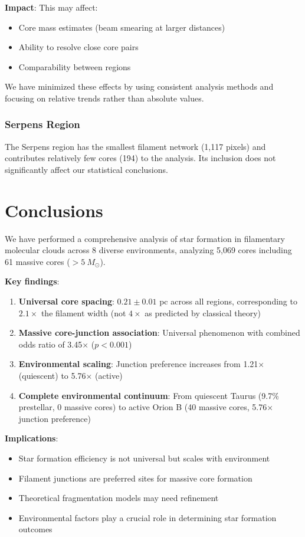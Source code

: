 \documentclass[11pt,a4paper]{article}
\begin{document}
\textbf{Impact}: This may affect:
\begin{itemize}
    \item Core mass estimates (beam smearing at larger distances)
    \item Ability to resolve close core pairs
    \item Comparability between regions
\end{itemize}

We have minimized these effects by using consistent analysis methods and focusing on relative trends rather than absolute values.

\subsubsection{Serpens Region}

The Serpens region has the smallest filament network (1,117 pixels) and contributes relatively few cores (194) to the analysis. Its inclusion does not significantly affect our statistical conclusions.

\section{Conclusions}

We have performed a comprehensive analysis of star formation in filamentary molecular clouds across 8 diverse environments, analyzing 5,069 cores including 61 massive cores ($>5~M_\odot$).

\textbf{Key findings}:
\begin{enumerate}
    \item \textbf{Universal core spacing}: $0.21 \pm 0.01$ pc across all regions, corresponding to $2.1\times$ the filament width (not $4\times$ as predicted by classical theory)
    \item \textbf{Massive core-junction association}: Universal phenomenon with combined odds ratio of 3.45$\times$ ($p < 0.001$)
    \item \textbf{Environmental scaling}: Junction preference increases from 1.21$\times$ (quiescent) to 5.76$\times$ (active)
    \item \textbf{Complete environmental continuum}: From quiescent Taurus (9.7\% prestellar, 0 massive cores) to active Orion B (40 massive cores, 5.76$\times$ junction preference)
\end{enumerate}

\textbf{Implications}:
\begin{itemize}
    \item Star formation efficiency is not universal but scales with environment
    \item Filament junctions are preferred sites for massive core formation
    \item Theoretical fragmentation models may need refinement
    \item Environmental factors play a crucial role in determining star formation outcomes
\end{itemize}
\end{document}
